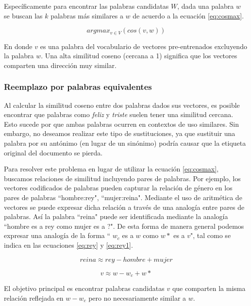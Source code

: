 Específicamente para encontrar las palabras candidatas $W$, dada una palabra $w$ se buscan las $k$ palabras más similares a $w$ de acuerdo a la ecuación \ref{eq:cosmax}.

\begin{equation}
    \label{eq:cosmax}
    argmax_{v \in V} (cos(v, w))
\end{equation}

En donde $v$ es una palabra del vocabulario de vectores pre-entrenados excluyendo la palabra $w$. Una alta similitud coseno (cercana a 1) significa que los vectores comparten una dirección muy similar.

\subsubsection{Reemplazo por palabras equivalentes}
Al calcular la similitud coseno entre dos palabras dados sus vectores, es posible encontrar que palabras como \textit{feliz} y \textit{triste} suelen tener una similitud cercana. Esto sucede por que ambas palabras ocurren en contextos de uso similares. Sin embargo, no deseamos realizar este tipo de sustituciones, ya que sustituir una palabra por su antónimo (en lugar de un sinónimo) podría causar que la etiqueta original del documento se pierda. 
 
 Para resolver este problema en lugar de utilizar la ecuación \ref{eq:cosmax}, buscamos relaciones de similitud incluyendo pares de palabras. 
 Por ejemplo, los vectores codificados de palabras pueden capturar la relación de género en los pares de palabras ``hombre:rey", ``mujer:reina".
Mediante el uso de aritmética de vectores se puede expresar dicha relación a través de una analogía entre pares de palabras. Así la palabra ``reina"  
puede ser identificada mediante la analogía ``hombre es a rey como mujer es a ?". De esta forma de manera general podemos expresar una analogía de la forma `` $w_c$ es a $w$ como $w*$ es a $v$", tal como se indica en las ecuaciones \ref{eq:rey} y \ref{eq:rey1}. 
 
 \begin{equation}
    \label{eq:rey}
     reina \approx  rey-hombre+mujer
 \end{equation}

\begin{equation}
    \label{eq:rey1}
    v \approx w-w_c+w*
\end{equation}
 

 El objetivo principal es encontrar palabras candidatas $v$ que comparten la misma relación reflejada en $w-w_c$ pero no necesariamente similar a $w$. 
 
